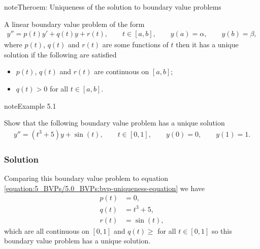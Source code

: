 \documentclass[letterpaper,10pt,english]{jupyterBook}
\begin{document}
\begin{sphinxadmonition}{note}{Theroem: Uniqueness of the solution to boundary value problems}

\sphinxAtStartPar
A linear boundary value problem of the form
\begin{equation}\label{equation:5_BVPs/5.0_BVPs:bvp-uniqueness-equation}
\begin{split}y'' = p(t)y' + q(t)y + r(t), \qquad t \in [a,b], \qquad y(a) = \alpha , \qquad y(b) = \beta ,\end{split}
\end{equation}
\sphinxAtStartPar
where \(p(t)\), \(q(t)\) and \(r(t)\) are some functions of \(t\) then it has a unique solution if the following are satisfied
\begin{itemize}
\item {} 
\sphinxAtStartPar
\(p(t)\), \(q(t)\) and \(r(t)\) are continuous on \([a, b]\);

\item {} 
\sphinxAtStartPar
\(q(t) > 0\) for all \(t\in [a,b]\).

\end{itemize}
\end{sphinxadmonition}

\begin{sphinxadmonition}{note}{Example 5.1}

\sphinxAtStartPar
Show that the following boundary value problem has a unique solution
\begin{align*}
    y'' = (t^3 +5)y + \sin (t), \qquad t \in [0,1], \qquad y(0) = 0, \qquad y(1) = 1.
\end{align*}\subsubsection*{Solution}

\sphinxAtStartPar
Comparing this boundary value problem to equation \eqref{equation:5_BVPs/5.0_BVPs:bvp-uniqueness-equation} we have
\begin{align*}
    p(t) &= 0,\\
    q(t) &= t^3 + 5,\\
    r(t) &= \sin(t),
\end{align*}
\sphinxAtStartPar
which are all continuous on \([0,1]\) and \(q(t)\geq \) for all \(t\in [0,1]\) so this boundary value problem has a unique solution.
\end{sphinxadmonition}

\sphinxstepscope
\end{document}
